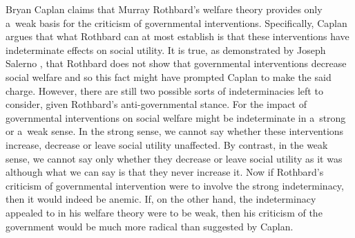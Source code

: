 Bryan Caplan 
\parencite*[][p.834]{caplan_austrian_1999} %
 claims that Murray Rothbard's welfare theory provides only a~weak basis for the criticism of governmental interventions. Specifically, Caplan argues that what Rothbard can at most establish is that these interventions have indeterminate effects on social utility. It is true, as demonstrated by Joseph Salerno 
\parencite*[][p.131]{salerno_mises_1993}, %
 that Rothbard does not show that governmental interventions decrease social welfare and so this fact might have prompted Caplan to make the said charge. However, there are still two possible sorts of indeterminacies left to consider, given Rothbard's anti-governmental stance. For the impact of governmental interventions on social welfare might be indeterminate in a~strong or a~weak sense. In the strong sense, we cannot say whether these interventions increase, decrease or leave social utility unaffected. By contrast, in the weak sense, we cannot say only whether they decrease or leave social utility as it was although what we can say is that they never increase it. Now if Rothbard's criticism of governmental intervention were to involve the strong indeterminacy, then it would indeed be anemic. If, on the other hand, the indeterminacy appealed to in his welfare theory were to be weak, then his criticism of the government would be much more radical than suggested by Caplan.



